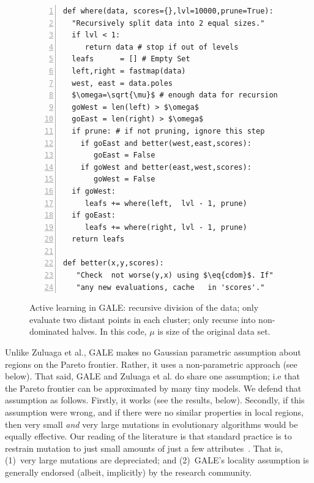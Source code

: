 \documentclass[10pt,journal,compsoc]{IEEEtran}
\newcommand{\eq}[1]{Equation~\ref{eq:#1}}
\newenvironment{changed}{\par}{\par}
\begin{document}
\begin{figure}[!b]
\begin{minipage}{3.2in}
\hspace{0.4}\begin{lstlisting}[mathescape,frame=l,numbers=left]
def where(data, scores={},lvl=10000,prune=True):  
  "Recursively split data into 2 equal sizes."
  if lvl < 1: 
     return data # stop if out of levels
  leafs      = [] # Empty Set
  left,right = fastmap(data)
  west, east = data.poles
  $\omega=\sqrt{\mu}$ # enough data for recursion
  goWest = len(left) > $\omega$  
  goEast = len(right) > $\omega$ 
  if prune: # if not pruning, ignore this step
    if goEast and better(west,east,scores): 
       goEast = False 
    if goWest and better(east,west,scores): 
       goWest = False 
  if goWest:  
     leafs += where(left,  lvl - 1, prune)  
  if goEast:  
     leafs += where(right, lvl - 1, prune) 
  return leafs

def better(x,y,scores):
   "Check  not worse(y,x) using $\eq{cdom}$. If"
   "any new evaluations, cache   in 'scores'."
\end{lstlisting}

\caption{Active learning in GALE:
recursive division of the data;
only evaluate two distant points in each cluster;
only recurse into non-dominated halves.
In this code, $\mu$ is size of the original data set.
}
\label{fig:whereCode} 
\end{minipage}
\end{figure}


\begin{changed}
Unlike Zuluaga et al., GALE makes no Gaussian parametric assumption about regions on the Pareto frontier.  
Rather, it uses a non-parametric approach (see below).
That said, GALE and  Zuluaga et al.  do share one  assumption; i.e that the Pareto frontier can be approximated by many tiny models.
We defend that assumption as follows. 
Firstly, it works (see the results, below).
Secondly, if this assumption were wrong, and if there were no similar
properties in local regions, then very small {\em and} very large mutations in  evolutionary algorithms would be equally effective. 
Our reading of the literature is that standard practice  is to restrain mutation to just small amounts of just a few attributes~\cite{goldberg00}.
That is, (1)~very large mutations are depreciated; and (2)~GALE's locality assumption is  generally  endorsed (albeit, implicitly)  by the research community.
\end{changed}
\end{document}
